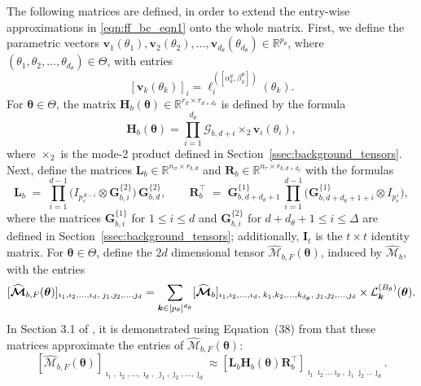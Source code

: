 \documentclass[final,3p,times]{elsarticle}
\newcommand{\mc}[1]{\mathcal{#1}}
\renewcommand{\vec}[1]{\boldsymbol{#1}}
\newcommand{\mat}[1]{\boldsymbol{#1}}
\newcommand{\R}{\mathbb{R}}
\newcommand{\ten}[1]{\boldsymbol{\mathcal{#1}}}
\newcommand{\tenh}[1]{\widehat{\boldsymbol{\mc{#1}}}}
\begin{document}
The following matrices are defined, in order to extend the entry-wise approximations in \eqref{eqn:ff_bc_eqn1} onto the whole matrix. First, we define the parametric vectors $\vec{v}_{1}(\theta_1), \vec{v}_{2}(\theta_2), \dots, \vec{v}_{d_\theta}(\theta_{d_{\theta}}) \in \R^{p_{\theta}}$, where $(\theta_1, \theta_2, \dots, \theta_{d_\theta}) \in \Theta$, with entries
$$[\vec{v}_k(\theta_k)]_{i} = \ell_i^{([\alpha^{\theta}_k, \beta^{\theta}_k])}(\theta_k).$$
For $\vec{\theta} \in \Theta$, the matrix $\mat{H}_b(\vec{\theta}) \in \R^{r_{d} \times r_{d+d_\theta}}$ is defined by the formula
$$\mat{H}_b(\vec{\theta}) = \prod_{i=1}^{d_\theta}\ten{G}_{b, d + i} \times_{2} \vec{v}_{i}(\theta_i),$$
where $\times_{2}$ is the mode-2 product defined in Section~\ref{ssec:background_tensors}. Next, define the matrices $\mat{L}_{b} \in \R^{n_{\sigma} \times r_{b, d}}$ and $\mat{R}_{b} \in \R^{n_{\tau} \times r_{b,d+d_\theta}}$ with the formulas
\[
\mat{L}_b \;=\;
\prod_{i=1}^{d-1}
\bigl( I_{p_s^{\,d-i}} \otimes \mat{G}_{b,i}^{\{2\}} \bigr) \,
\mat{G}_{b,d}^{\{2\}}, 
\qquad
\mat{R}_{b}^{\top} \;=\;
\mat{G}_{b,d+d_\theta+1}^{\{1\}} \,
\prod_{i=1}^{d-1}
\bigl( \mat{G}_{b,d+d_\theta+1+i}^{\{1\}} \otimes I_{p_s^{\,i}} \bigr),
\]
where the matrices $\mat{G}_{b, i}^{\{1\}}$ for $1 \le i \le d$ and $\mat{G}_{b, i}^{\{2\}}$ for $d+d_{\theta} + 1 \le i \le \Delta$ are defined in Section~\ref{ssec:background_tensors}; additionally,   $\mat{I}_t$ is the $t\times t$ identity matrix.
For $\vec{\theta} \in \Theta$,  define the $2d$ dimensional tensor $\tenh{M}_{b, F}(\vec{\theta})$, induced by $\tenh{M}_{b}$, with the  entries
$$[\tenh{M}_{b, F}(\vec{\theta})]_{\imath_1, \imath_2, \dots, \imath_d,\;
                              \jmath_1, \jmath_2, \dots, \jmath_d }
  = \sum_{\vec{k} \in [p_\theta]^{d_\theta}}
     [\tenh{M}_{b}]_{\imath_1, \imath_2, \dots, \imath_d,\;
                     k_1, k_2, \dots, k_{d_\theta},\;
                     \jmath_1, \jmath_2, \dots, \jmath_d} \\
     \times \mc{L}_{\vec{k}}^{(B_{\theta})}(\vec{\theta}).$$
In Section 3.1 of \cite{khan2025parametric}, it is demonstrated using Equation~(38) from \cite{shi2023parallel} that these matrices approximate the entries of $\tenh{M}_{b, F}(\vec{\theta})$:
\begin{equation}\label{eqn:param_h2_relate}
[\tenh{M}_{b, F}(\vec{\theta})]_{\imath_1, \imath_2, \dots, \imath_d,\;
                              \jmath_1, \jmath_2, \dots, \jmath_d } \approx [\mat{L}_{b}\mat{H}_{b}(\vec{\theta})\mat{R}_{b}^{\top}]_{\overline{\imath_1 \imath_2 \dots \imath_d}, \overline{\jmath_1 \jmath_2 \dots \jmath_d}}.
\end{equation}
\end{document}
